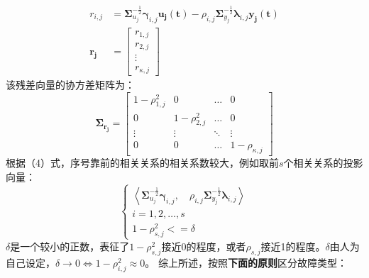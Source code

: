 \documentclass[lang=cn,11pt,a4paper]{elegantpaper}
\begin{document}
\begin{equation}
	\begin{aligned}
		r_{i,j} &=\boldsymbol{\Sigma}_{u_j}^{-\frac{1}{2}}\boldsymbol{\gamma}_{i,j}\boldsymbol{u_j(t)}-\rho_{i,j}\boldsymbol{\Sigma}_{y_j}^{-\frac{1}{2}}\boldsymbol{\lambda}_{i,j}\boldsymbol{y_j(t)} \\
		\boldsymbol{r_j} &= \left[\begin{array}{c}
			r_{1,j}\\
			r_{2,j}\\
			\vdots\\
			r_{\kappa,j}
		\end{array}\right]
	\end{aligned}
\end{equation}
该残差向量的协方差矩阵为：
\begin{equation}
	\boldsymbol{\Sigma}_{\boldsymbol{r_j}}=\left[\begin{array}{cccc}
		1-\rho_{1,j}^2& 0 & \ldots & 0 \\
		0& 1-\rho_{2,j}^2 & \ldots & 0 \\
		\vdots& \vdots &  \ddots&\vdots  \\
		0&  0&  \ldots&1-\rho_{\kappa,j} 
	\end{array}\right]
\end{equation}
根据（4）式，序号靠前的相关关系的相关系数较大，例如取前$s$个相关关系的投影向量：
\begin{equation}
	\begin{cases}
		\left\langle
		\boldsymbol{\Sigma}_{u_j}^{-\frac{1}{2}}\boldsymbol{\gamma}_{i,j},\quad\rho_{i,j}\boldsymbol{\Sigma}_{y_j}^{-\frac{1}{2}}\boldsymbol{\lambda}_{i,j}
		\right\rangle \\
		i = 1,2,\ldots,s\\
		1-\rho_{s,j}^2<=\delta
	\end{cases}
\end{equation}
$\delta$是一个较小的正数，表征了$1-\rho_{s,j}^2$接近0的程度，或者$\rho_{s,j}$接近1的程度。$\delta$由人为自己设定，$\delta\rightarrow 0\Leftrightarrow
1-\rho_{i,j}^2\approx0$。
综上所述，按照\textbf{下面的原则}区分故障类型：
\end{document}
